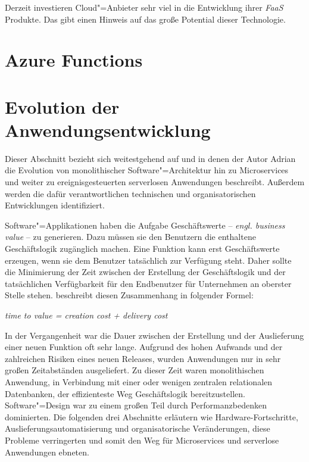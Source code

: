 Derzeit investieren Cloud"=Anbieter sehr viel in die Entwicklung ihrer \textit{FaaS} Produkte. Das gibt einen Hinweis auf das große Potential dieser Technologie.

\section{Azure Functions}


\section{Evolution der Anwendungsentwicklung}

Dieser Abschnitt bezieht sich weitestgehend auf \cite{Cock16EvoFunc} und \cite{Cock17ShrinkingMS} in denen der Autor Adrian \citeauthor{Cock16EvoFunc} die Evolution von monolithischer Software"=Architektur hin zu Microservices und weiter zu ereignisgesteuerten serverlosen Anwendungen beschreibt. Außerdem werden die dafür verantwortlichen technischen und organisatorischen Entwicklungen identifiziert.

Software"=Applikationen haben die Aufgabe Geschäftswerte -- \textit{engl. business value} -- zu generieren. Dazu müssen sie den Benutzern die enthaltene Geschäftslogik zugänglich machen. Eine Funktion kann erst Geschäftswerte erzeugen, wenn sie dem Benutzer tatsächlich zur Verfügung steht. Daher sollte die Minimierung der Zeit zwischen der Erstellung der Geschäftslogik und der tatsächlichen Verfügbarkeit für den Endbenutzer für Unternehmen an oberster Stelle stehen. \citeauthor{Cock16EvoFunc} beschreibt diesen Zusammenhang in folgender Formel:

\begin{center}
\textit{time to value = creation cost + delivery cost}
\end{center}

In der Vergangenheit war die Dauer zwischen der Erstellung und der Auslieferung einer neuen Funktion oft sehr lange. Aufgrund des hohen Aufwands und der zahlreichen Risiken eines neuen Releases, wurden Anwendungen nur in sehr großen Zeitabständen ausgeliefert. Zu dieser Zeit waren monolithischen Anwendung, in Verbindung mit einer oder wenigen zentralen relationalen Datenbanken, der effizienteste Weg Geschäftslogik bereitzustellen. Software"=Design war zu einem großen Teil durch Performanzbedenken dominierten. Die folgenden drei Abschnitte erläutern wie Hardware-Fortschritte, Auslieferungsautomatisierung und organisatorische Veränderungen, diese Probleme verringerten und somit den Weg für Microservices und serverlose Anwendungen ebneten.

